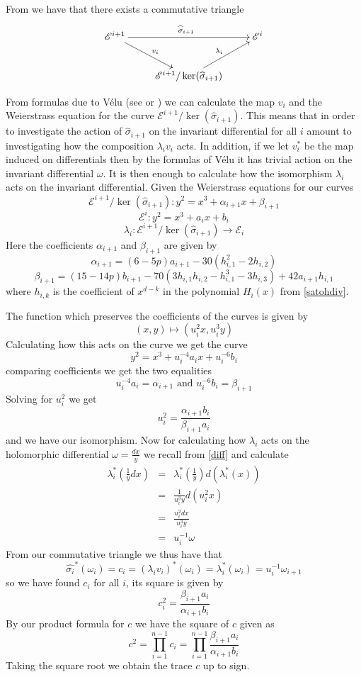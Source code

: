 From \cite{AEC} we have that there exists a commutative triangle
$$
\xymatrix{
  \mathscr{E}^{i+1} \ar[rr]^{\widehat{\sigma}_{i+1}} \ar[dr]^{v_{i}} && \mathscr{E}^i \\
  & \mathscr{E}^{i+1}/\ker(\widehat{\sigma}_{i+1}) \ar[ur]^{\lambda_i} & 
}
$$

From formulas due to V\'{e}lu (see \cite{Velu} or \cite{Sato}) we can calculate the map
$v_i$ and the Weierstrass equation for the curve $\mathscr{E}^{i+1}/\ker(\widehat{\sigma}_{i+1})$.
This means that in order to investigate the action of
$\widehat{\sigma}_{i+1}$ on the invariant differential for all $i$ amount to investigating
how the composition $\lambda_i v_i$ acts. In addition, if we let $v_i^*$ be the map induced 
on differentials then by the formulas of V\'{e}lu it has trivial action on the invariant differential $\omega$.
It is then enough to calculate how the isomorphism $\lambda_i$ acts on the invariant differential. 
Given the Weierstrass equations for our curves
$$ \mathscr{E}^{i+1}/\ker(\widehat{\sigma}_{i+1}): y^2 = x^3 + \alpha_{i+1}x + \beta_{i+1}$$
$$ \mathscr{E}^i: y^2 = x^3 + a_i x + b_i $$
$$ \lambda_i: \mathscr{E}^{i+1}/\ker(\widehat{\sigma}_{i+1}) \rightarrow \mathscr{E}_i $$
Here the coefficients $\alpha_{i+1}$ and $\beta_{i+1}$ are given by
$$\alpha_{i+1} = (6-5p)a_{i+1}-30(h_{i,1}^2-2h_{i,2})$$
$$\beta_{i+1}  = (15-14p)b_{i+1}-70(3h_{i,1}h_{i,2}-h_{i,1}^3-3h_{i,3})+42a_{i+1}h_{i,1}$$
where $h_{i,k}$ is the coefficient of $x^{d-k}$ in the polynomial $H_i(x)$ from \ref{satohdiv}.

The function which preserves the coefficients of the curves is given by
$$(x,y) \mapsto (u_i^2 x, u_i^3 y) $$
Calculating how this acts on the curve we get the curve
$$ y^2 = x^3 + u_i^{-4} a_i x + u_i^{-6} b_i$$
comparing coefficients we get the two equalities
$$ u_i^{-4} a_i = \alpha_{i+1} \text{ and } u_i^{-6} b_i = \beta_{i+1} $$
Solving for $u_i^2$ we get
$$ u_i^2 = \frac{\alpha_{i+1} b_i}{\beta_{i+1} a_i} $$
and we have our isomorphism. Now for calculating how $\lambda_i$ acts on the holomorphic
differential $\omega=\frac{dx}{y}$ we recall from \ref{diff} and calculate
\begin{eqnarray}
 \lambda_i^*(\frac{1}{y} dx) &=& \lambda_i^*(\frac{1}{y}) d(\lambda_i^*(x)) \nonumber \\
			     &=& \frac{1}{u_i^3 y} d(u_i^2 x) \nonumber \\
			     &=& \frac{u_i^2 dx}{u_i^3 y} \nonumber \\
			     &=& u_i^{-1} \omega \nonumber
\end{eqnarray}
From our commutative triangle we thus have that
$$ \widehat{\sigma_i}^*(\omega_i) = c_i = (\lambda_i v_i)^*(\omega_i) = \lambda_i^*(\omega_i) = u_i^{-1}\omega_{i+1}$$
so we have found $c_i$ for all $i$, its square is given by
$$ c_i^2 = \frac{\beta_{i+1} a_i}{\alpha_{i+1} b_i} $$
By our product formula for $c$ we have the square of $c$ given as
$$ c^2 = \prod_{i=1}^{n-1} c_i = \prod_{i=1}^{n-1} \frac{\beta_{i+1} a_i}{\alpha_{i+1} b_i} $$
Taking the square root we obtain the trace $c$ up to sign.

